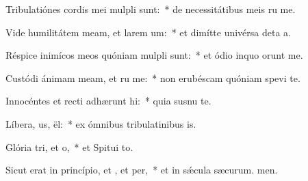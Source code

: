 \item Tribulatiónes cordis mei mulpli sunt:~* de necessitátibus meis ru me.
\item Vide humilitátem meam, et larem um:~* et dimítte univérsa deta a.
\item Réspice inimícos meos quóniam mulpli sunt:~* et ódio inquo orunt me.
\item Custódi ánimam meam, et ru me:~* non erubéscam quóniam spevi  te.
\item Innocéntes et recti adhærunt hi:~* quia susnu te.
\item Líbera, us, ël:~* ex ómnibus tribulatinibus is.
\item Glória tri, et o,~* et Spitui to.
\item Sicut erat in princípio, et , et per,~* et in sǽcula sæcurum. men.
